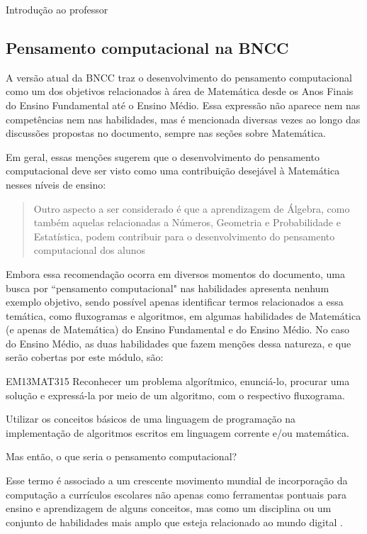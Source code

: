 \mainmatter

\begin{apresentacao}{Introdução ao professor}
\subsection{Pensamento computacional na BNCC}

A versão atual da BNCC traz o desenvolvimento do pensamento computacional como um dos objetivos relacionados à área de Matemática desde os Anos Finais do Ensino Fundamental até o Ensino Médio. Essa expressão não aparece nem nas competências nem nas habilidades, mas é mencionada diversas vezes ao longo das discussões propostas no documento, sempre nas seções sobre Matemática.

Em geral, essas menções sugerem que o desenvolvimento do pensamento computacional deve ser visto como uma contribuição desejável à Matemática nesses níveis de ensino:

\begin{quote}
Outro aspecto a ser considerado é que a aprendizagem de Álgebra, como também aquelas relacionadas a Números, Geometria e Probabilidade e Estatística, podem contribuir para o desenvolvimento do pensamento computacional dos alunos \citep[BNCC,][p. 271]{BNCC2018}
\end{quote}

Embora essa recomendação ocorra em diversos momentos do documento, uma busca por ``pensamento computacional"{} nas habilidades apresenta nenhum exemplo objetivo, sendo possível apenas identificar termos relacionados a essa temática, como fluxogramas e algoritmos, em algumas habilidades de Matemática (e apenas de Matemática) do Ensino Fundamental e do Ensino Médio. No caso do Ensino Médio, as duas habilidades que fazem menções dessa natureza, e que serão cobertas por este módulo, são:

\begin{habilities}{EM13MAT315}
Reconhecer um problema algorítmico, enunciá-lo, procurar uma solução e expressá-la por meio de um algoritmo, com o respectivo fluxograma.


Utilizar os conceitos básicos de uma linguagem de programação na implementação de algoritmos escritos em linguagem corrente e/ou matemática.
\end{habilities}

Mas então, o que seria o pensamento computacional?

Esse termo é associado a um crescente movimento mundial de incorporação da computação a currículos escolares não apenas como ferramentas pontuais para ensino e aprendizagem de alguns conceitos, mas como um disciplina ou um conjunto de habilidades mais amplo que esteja relacionado ao mundo digital \citep{raabe2020}.


\end{apresentacao}
